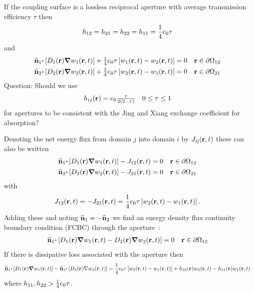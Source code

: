 \documentclass[a4paper]{article}
\numberwithin{equation}{section}
\begin{document}
If the coupling surface is a lossless reciprocal aperture with average
transmission efficiency $\tau$ then
\begin{align}
h_{12} = h_{21} = h_{22} = h_{11} = \frac{1}{4}\rc_0\tau
\end{align}
and
\begin{align}
\begin{matrix}
\uvn_1{\vcdot}\left[D_1\pr{\vnabla}w_1\prt\right]+\frac{1}{4}\rc_0\tau\left[w_1\prt-w_2\prt\right]=0 &\vr\in\partial\Omega_{12}
\end{matrix}\\
\begin{matrix}
\uvn_2{\vcdot}\left[D_2\pr{\vnabla}w_2\prt\right]+\frac{1}{4}\rc_0\tau\left[w_2\prt-w_1\prt\right]=0 &\vr\in\partial\Omega_{21}
\end{matrix}
\end{align}
{\color{red}
Question: Should we use
\begin{align}
\begin{matrix}
h_{ij}\pr = \rc_0\frac{\tau}{2\left(2-\tau\right)} &0\leq\tau\leq 1
\end{matrix}
\end{align}
for apertures to be consistent with the Jing and Xiang exchange coefficient for
absorption? 
}

Denoting the net energy flux from domain $j$ into domain $i$ by 
$J_{\mathit{ij}}\prt$ these can also be written
\begin{align}
\begin{matrix}
\uvn_1{\vcdot}\left[D_1\pr{\vnabla}w_1\prt\right]-J_{12}\prt=0 &\vr\in\partial\Omega_{12}
\end{matrix}\\
\begin{matrix}
\uvn_2{\vcdot}\left[D_2\pr{\vnabla}w_2\prt\right]-J_{21}\prt=0 &\vr\in\partial\Omega_{21}
\end{matrix}
\end{align}
with
\begin{align}
J_{12}\prt = -J_{21}\prt = \frac{1}{4}\rc_0\tau\left[w_2\prt-w_1\prt\right].
\end{align}
Adding these and noting $\uvn_1=-\uvn_2$ we find an energy density flux continuity
boundary condition (FCBC) through the aperture~\citep{Billon2008}:
\begin{align}
\begin{matrix}
\uvn_1{\vcdot}\left[D_1\pr{\vnabla}w_1\prt-D_2\pr{\vnabla}w_2\prt\right]=0 &\vr\in\partial\Omega_{12}
\end{matrix}
\end{align}
If there is dissipative loss associated with the aperture then
\begin{align}
\uvn_1{\vcdot}\left[D_1\pr{\vnabla}w_1\prt\right]-\uvn_2{\vcdot}\left[D_2\pr{\nabla}w_2\prt\right]=\frac{1}{4}\rc_0\tau
\left[w_2\prt-w_1\prt\right]+h_{22}\pr w_2\prt-h_{11}\pr w_1\prt
\end{align}
where $h_{11},h_{22}>\frac{1}{4}\rc_0\tau$.
\end{document}
